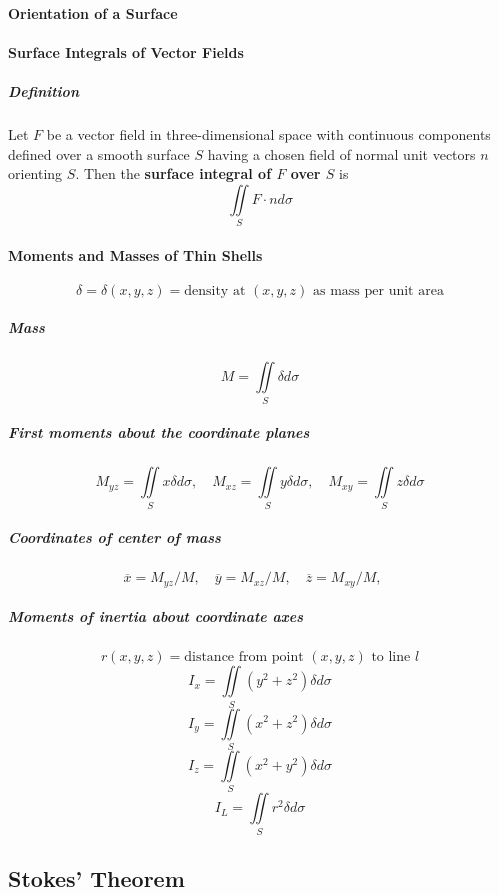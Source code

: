\documentclass{article}
\begin{document}
            \paragraph{Orientation of a Surface}
            \paragraph{Surface Integrals of Vector Fields}
                \subparagraph{Definition} Let $F$ be a vector field in three-dimensional space with continuous components defined over a smooth surface $S$ having a chosen field of normal unit vectors $n$ orienting $S$. Then the \textbf{surface integral of $F$ over $S$} is
                \[\iint\limits_SF\cdot nd\sigma\]
            \paragraph{Moments and Masses of Thin Shells}
                \[\delta=\delta(x,y,z)=\text{density at }(x,y,z)\text{ as mass per unit area}\]
                \subparagraph{Mass}
                \[M=\iint\limits_S\delta d\sigma\]
                \subparagraph{First moments about the coordinate planes}
                \[M_{yz}=\iint\limits_Sx\delta d\sigma,\quad M_{xz}=\iint\limits_Sy\delta d\sigma,\quad M_{xy}=\iint\limits_Sz\delta d\sigma\]
                \subparagraph{Coordinates of center of mass}
                \[\overline{x}=M_{yz}/M,\quad\overline{y}=M_{xz}/M,\quad\overline{z}=M_{xy}/M,\quad\]
                \subparagraph{Moments of inertia about coordinate axes}
                \[r(x,y,z)=\text{distance from point }(x,y,z)\text{ to line }l\]
                \[I_x=\iint\limits_S(y^2+z^2)\delta d\sigma\]
                \[I_y=\iint\limits_S(x^2+z^2)\delta d\sigma\]
                \[I_z=\iint\limits_S(x^2+y^2)\delta d\sigma\]
                \[I_L=\iint\limits_Sr^2\delta d\sigma\]
        \subsection{Stokes' Theorem}
\end{document}
